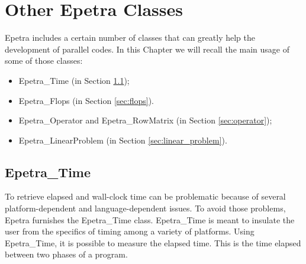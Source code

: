 % 
% 
% 
%  
%  
% 

\section{Other Epetra Classes}
\label{chap:epetra_others}

Epetra includes a certain number of classes that can greatly help the
development of parallel codes. In this Chapter we will recall the main
usage of some of those classes:
\begin{itemize}
\item Epetra\_Time (in Section \ref{sec:time});
\item Epetra\_Flops (in Section \ref{sec:flops}).
\item Epetra\_Operator and Epetra\_RowMatrix (in Section \ref{sec:operator});
\item Epetra\_LinearProblem (in Section \ref{sec:linear_problem}).
\end{itemize}


\subsection{Epetra\_Time}
\label{sec:time}

To retrieve elapsed and wall-clock time can be problematic because of
several platform-dependent and language-dependent issues. To avoid those
problems, Epetra furnishes the Epetra\_Time class.  Epetra\_Time is
meant to insulate the user from the specifics of timing among a variety
of platforms.  Using Epetra\_Time, it is possible to measure the elapsed
time. This is the time elapsed between two phases of a program.

